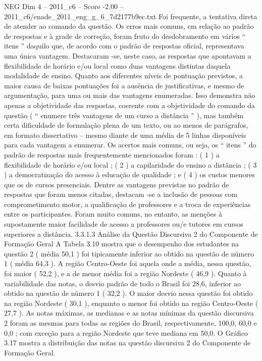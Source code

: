 \begin{textsample}{NEG Dim 4 – 2011\_c6 – Score -2.00 – 2011\_c6/enade\_2011\_eng\_g\_6\_7d2177b9ec.txt}
Foi frequente, a tentativa direta de atender ao comando da questão.
Os erros mais comuns, em relação ao padrão de respostas e à grade de correção, foram fruto do desdobramento em vários “ itens ” daquilo que, de acordo com o padrão de respostas oficial, representava uma única vantagem.
Destacaram -se, neste caso, as respostas que apontavam a flexibilidade de horário e/ou local como duas vantagens distintas daquela modalidade de ensino.
Quanto aos diferentes níveis de pontuação previstos, a maior causa de baixas pontuações foi a ausência de justificativas, e mesmo de argumentação, para uma ou mais das vantagens enumeradas.
Isso demonstra não apenas a objetividade das respostas, coerente com a objetividade do comando da questão ( “ enumere três vantagens de um curso a distância ” ), mas também certa dificuldade de formulação plena de um texto, ou ao menos de parágrafos, em formato dissertativo – mesmo diante de uma média de 5 linhas disponíveis para cada vantagem a enumerar.
Os acertos mais comuns, ou seja, os “ itens ” do padrão de respostas mais frequentemente mencionados foram : ( 1 ) a flexibilidade de horário e/ou local ; ( 2 ) a capilaridade do ensino a distância ; ( 3 ) a democratização do acesso à educação de qualidade ; e ( 4 ) os custos menores que os de cursos presenciais.
Dentre as vantagens previstas no padrão de respostas que foram menos citadas, destacam -se a inclusão de pessoas com comprometimento motor, a qualificação de professores e a troca de experiências entre os participantes.
Foram muito comuns, no entanto, as menções à supostamente maior facilidade de acesso a professores ou/e tutores em cursos superiores a distância. 3.3.1.3 Análise da Questão Discursiva 2 do Componente de Formação Geral A Tabela 3.10 mostra que o desempenho dos estudantes na questão 2 ( média 50,1 ) foi tipicamente inferior ao obtido na questão de número 1 ( média 64,3 ).
A região Centro-Oeste foi aquela onde a média, nessa questão, foi maior ( 52,2 ), e a de menor média foi a região Nordeste ( 46,9 ).
Quanto à variabilidade das notas, o desvio padrão de todo o Brasil foi 28,6, inferior ao obtido na questão de número 1 ( 32,2 ).
O maior desvio nessa questão foi obtido na região Nordeste ( 30,1 ), enquanto o menor foi obtido na região Centro-Oeste ( 27,7 ).
As notas máximas, as medianas e as notas mínimas da questão discursiva 2 foram as mesmas para todas as regiões do Brasil, respectivamente, 100,0, 60,0 e 0,0 ; com exceção para a região Nordeste que teve mediana em 50,0.
O Gráfico 3.17 mostra a distribuição das notas na questão discursiva 2 do Componente de Formação Geral.

\end{textsample}
